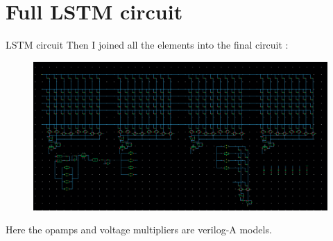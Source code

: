 \documentclass{beamer}
\begin{document}
\section{Full LSTM circuit}

\begin{frame}{LSTM circuit}
    Then I joined all the elements into the final circuit :
    \begin{figure}
        \centering
        \includegraphics[height=0.5\textheight]{figures/LSTM-NP.png}
    \end{figure}
    Here the opamps and voltage multipliers are verilog-A models.
\end{frame}

\end{document}
